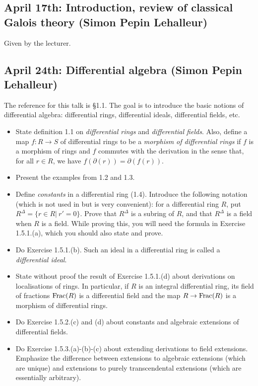 \documentclass{amsart}
\theoremstyle{definition}
\theoremstyle{remark}
\newcommand{\ra}{\rightarrow}
\newcommand{\Frac}{\mathop{\rm Frac}\nolimits}
\begin{document}
\subsection{April 17th: Introduction, review of classical Galois theory (Simon Pepin Lehalleur)}

Given by the lecturer.

\subsection{April 24th: Differential algebra (Simon Pepin Lehalleur)}

The reference for this talk is \S 1.1. The goal is to introduce the basic notions of differential algebra: differential rings, differential ideals, differential fields, etc.

\begin{itemize}
\item State definition 1.1 on \emph{differential rings} and \emph{differential fields}. Also, define a map \(f:R \rightarrow S\) of differential rings to be a \emph{morphism of differential rings} if \(f\) is a morphism of rings and \(f\) commutes with the derivation in the sense that, for all \(r\in R\), we have \(f(\partial(r))=\partial(f(r))\).
\item Present the examples from 1.2 and 1.3.
\item Define \emph{constants} in a differential ring (1.4). Introduce the following notation (which is not used in \cite{DGT} but is very convenient): for a differential ring \(R\), put \(R^{\Delta}=\{r\in R| \ r'=0\}\). Prove that \(R^{\Delta}\) is a subring of \(R\), and that \(R^{\Delta}\) is a field when \(R\) is a field. While proving this, you will need the formula in Exercise 1.5.1.(a), which you should also state and prove.
\item Do Exercise 1.5.1.(b). Such an ideal in a differential ring is called a \emph{differential ideal}.
\item State without proof the result of Exercise 1.5.1.(d) about derivations on localisations of rings. In particular, if \(R\) is an integral differential ring, its field of fractions \(\Frac(R)\) is a differential field and the map \(R\ra \Frac(R)\) is a morphism of differential rings.
\item Do Exercise 1.5.2.(c) and (d) about constants and algebraic extensions of differential fields.
\item Do Exercise 1.5.3.(a)-(b)-(c) about extending derivations to field extensions. Emphasize the difference between extensions to algebraic extensions (which are unique) and extensions to purely transcendental extensions (which are essentially arbitrary).
\end{itemize}
\end{document}

